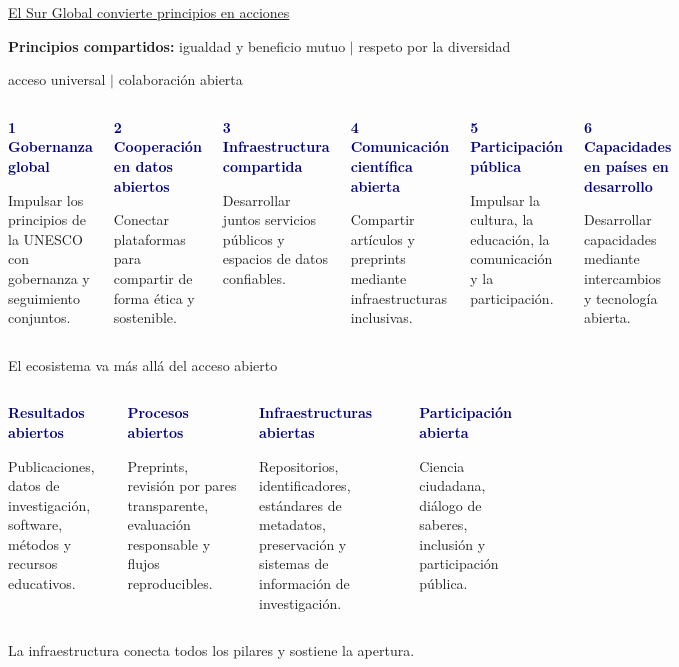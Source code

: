 \documentclass[aspectratio=169,11pt]{beamer}
\newcommand{\keypoint}[2]{%
  \begin{minipage}[t]{0.98\linewidth}
  \colorbox{Mist}{\parbox{0.92\linewidth}{\raggedright\vspace{0.08cm}\textcolor{Navy}{\bfseries #1}\par\small #2\vspace{0.08cm}}}
  \end{minipage}}
\begin{document}
\begin{frame}{\href{https://en.most.gov.cn/pressroom/202512/t20251219_195559.html}{El Sur Global convierte principios en acciones}}
  \vspace{0.05cm}
  \begin{center}
    \small\textbf{Principios compartidos:} igualdad y beneficio mutuo \quad $\vert$ \quad respeto por la diversidad

    \vspace{0.05cm}
    acceso universal \quad $\vert$ \quad colaboración abierta
  \end{center}
  \vspace{0.10cm}
  \begin{columns}[T,onlytextwidth]
      \keypoint{1 \; Gobernanza global}{Impulsar los principios de la UNESCO con gobernanza y seguimiento conjuntos.}
      \vspace{0.04cm}
      \keypoint{2 \; Cooperación en datos abiertos}{Conectar plataformas para compartir de forma ética y sostenible.}
      \vspace{0.04cm}
      \keypoint{3 \; Infraestructura compartida}{Desarrollar juntos servicios públicos y espacios de datos confiables.}
      \keypoint{4 \; Comunicación científica abierta}{Compartir artículos y preprints mediante infraestructuras inclusivas.}
      \vspace{0.04cm}
      \keypoint{5 \; Participación pública}{Impulsar la cultura, la educación, la comunicación y la participación.}
      \vspace{0.04cm}
      \keypoint{6 \; Capacidades en países en desarrollo}{Desarrollar capacidades mediante intercambios y tecnología abierta.}
  \end{columns}
\end{frame}

\begin{frame}{El ecosistema va más allá del acceso abierto}
  \vspace{0.15cm}
  \begin{columns}[T,onlytextwidth]
      \keypoint{Resultados abiertos}{Publicaciones, datos de investigación, software, métodos y recursos educativos.}
      \vspace{0.28cm}

      \keypoint{Procesos abiertos}{Preprints, revisión por pares transparente, evaluación responsable y flujos reproducibles.}
      \keypoint{Infraestructuras abiertas}{Repositorios, identificadores, estándares de metadatos, preservación y sistemas de información de investigación.}
      \vspace{0.28cm}

      \keypoint{Participación abierta}{Ciencia ciudadana, diálogo de saberes, inclusión y participación pública.}
  \end{columns}
  \vfill
  \begin{center}\alert{La infraestructura conecta todos los pilares y sostiene la apertura.}\end{center}
\end{frame}
\end{document}
